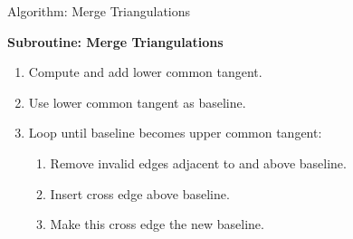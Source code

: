 \documentclass[aspectratio=169,fleqn]{beamer}
\begin{document}
  \begin{frame}{Algorithm: Merge Triangulations}
    \onslide<+->
    \onslide<+->
    \begin{mybox}
      \textbf{Subroutine: Merge Triangulations}
      \begin{enumerate}
        \item<+-> Compute and add lower common tangent.
        \item<+-> Use lower common tangent as baseline.
        \item<+-> Loop until baseline becomes upper common tangent:
          \begin{enumerate}
            \item<+-> Remove invalid edges adjacent to and above baseline.
            \item<+-> Insert cross edge above baseline.
            \item<+-> Make this cross edge the new baseline.
          \end{enumerate}
      \end{enumerate}
    \end{mybox}
  \end{frame}
\end{document}
